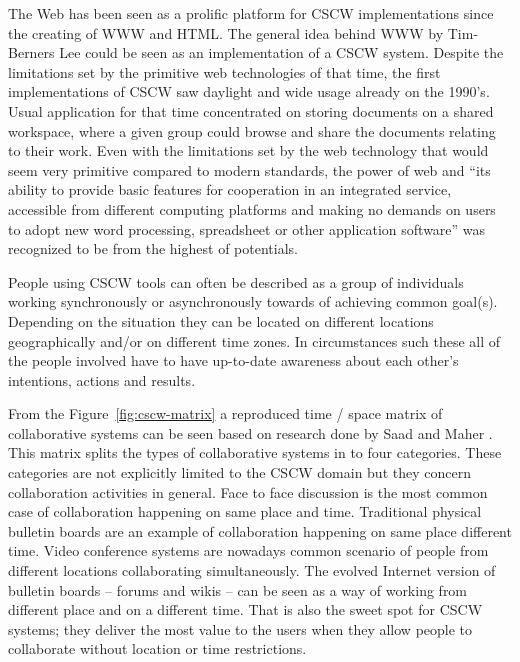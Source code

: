 The Web has been seen as a prolific platform for CSCW implementations since the creating of WWW and HTML. The general idea behind WWW by Tim-Berners Lee could be seen as an implementation of a CSCW system. Despite the limitations set by the primitive web technologies of that time, the first implementations of CSCW saw daylight and wide usage already on the 1990's. Usual application for that time concentrated on storing documents on a shared workspace, where a given group could browse and share the documents relating to their work. Even with the limitations set by the web technology that would seem very primitive compared to modern standards, the power of web and ``its ability to provide basic features for cooperation in an integrated service, accessible from different computing platforms and making no demands on users to adopt new word processing, spreadsheet or other application software'' was recognized to be from the highest of potentials. \cite{bentley_basic_1997}

People using CSCW tools can often be described as a group of individuals working synchronously or asynchronously towards of achieving common goal(s). Depending on the situation they can be located on different locations geographically and/or on different time zones. In circumstances such these all of the people involved have to have up-to-date awareness about each other's intentions, actions and results. \cite{carroll_notification_2003}

From the Figure~\ref{fig:cscw-matrix} a reproduced time / space matrix of collaborative systems can be seen based on research done by Saad and Maher \cite{saad_shared_1996}. This matrix splits the types of collaborative systems in to four categories. These categories are not explicitly limited to the CSCW domain but they concern collaboration activities in general. Face to face discussion is the most common case of collaboration happening on same place and time. Traditional physical bulletin boards are an example of collaboration happening on same place different time. Video conference systems are nowadays common scenario of people from different locations collaborating simultaneously. The evolved Internet version of bulletin boards -- forums and wikis -- can be seen as a way of working from different place and on a different time. That is also the sweet spot for CSCW systems; they deliver the most value to the users when they allow people to collaborate without location or time restrictions. %

